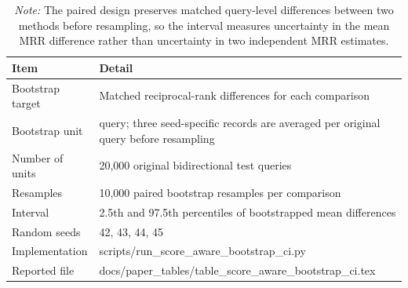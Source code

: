 \begin{table}[t]
\centering
\small
\caption{Bootstrap implementation details for score-aware comparisons.}
\label{tab:supp_bootstrap_implementation}
\setlength{\tabcolsep}{4pt}
\begin{tabular}{p{}p{}}
\toprule
Item & Detail \\
\midrule
Bootstrap target & Matched reciprocal-rank differences for each comparison \\
Bootstrap unit & query; three seed-specific records are averaged per original query before resampling \\
Number of units & 20,000 original bidirectional test queries \\
Resamples & 10,000 paired bootstrap resamples per comparison \\
Interval & 2.5th and 97.5th percentiles of bootstrapped mean differences \\
Random seeds & 42, 43, 44, 45 \\
Implementation & scripts/run\_score\_aware\_bootstrap\_ci.py \\
Reported file & docs/paper\_tables/table\_score\_aware\_bootstrap\_ci.tex \\
\bottomrule
\end{tabular}
\vspace{0.4ex}
\caption*{\footnotesize \textit{Note:} The paired design preserves matched query-level differences between two methods before resampling, so the interval measures uncertainty in the mean MRR difference rather than uncertainty in two independent MRR estimates.}
\end{table}
